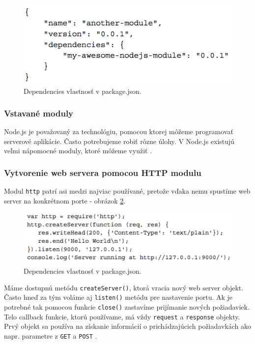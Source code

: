\begin{figure}[H]
  \centering
  \includegraphics[scale=0.7]{img/npm/npm-overview-dependency.png}
   \caption{Dependencies vlastnosť v package.json.}
  \label{img-npm-dependencies}
\end{figure}

\subsubsection{Vstavané moduly}
Node.js je považovaný za technológiu, pomocou ktorej môžeme programovať serverové aplikácie. Často potrebujeme robiť rôzne úlohy. V Node.js existujú veľmi nápomocné moduly, ktoré môžeme využiť \cite{nodejs-by-example}.

\subsubsection{Vytvorenie web servera pomocou HTTP modulu}
Modul \verb|http| patrí asi medzi najviac používané, pretože vďaka nemu spustíme web server na konkrétnom porte - obrázok \ref{img-npm-http}.

\begin{figure}[H]
  \centering
  \includegraphics[scale=0.7]{img/npm/npm-http-module.png}
  \caption{Dependencies vlastnosť v package.json.}
  \label{img-npm-http}
\end{figure}

Máme dostupnú metódu \verb|createServer()|, ktorá vracia nový web server objekt. Často hneď za tým voláme aj \verb|listen()| metódu pre nastavenie portu. Ak je potrebné tak pomocou funkcie \verb|close()| zastavíme prijímanie nových požiadaviek. Telo callback funkcie, ktorú používame, má vždy \verb|request| a \verb|response| objekty. Prvý objekt sa používa na získanie informácií o prichádzajúcich požiadavkách ako napr. parametre z \verb|GET| a \verb|POST| \cite{nodejs-by-example}.


